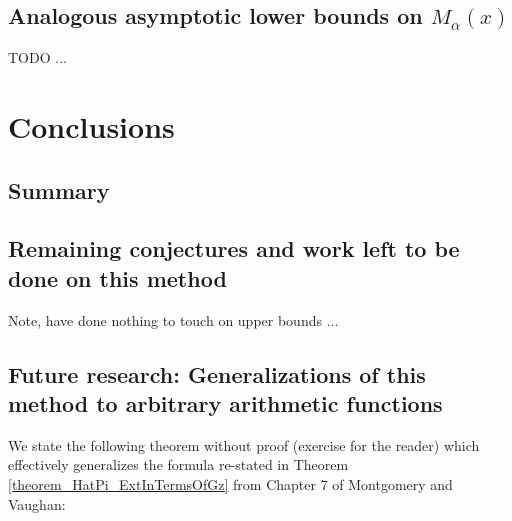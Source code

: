 \documentclass[11pt,reqno,a4letter]{article}
\numberwithin{figure}{section}
\numberwithin{table}{section}
\theoremstyle{plain}
\numberwithin{theorem}{section}
\theoremstyle{definition}
\begin{document}
\subsection{Analogous asymptotic lower bounds on $M_{\alpha}(x)$} 

TODO ... 

\newpage 
\section{Conclusions} 

\subsection{Summary} 

\subsection{Remaining conjectures and work left to be done on this method} 

Note, have done nothing to touch on upper bounds ... 

\subsection{Future research: Generalizations of this method to arbitrary arithmetic functions} 

We state the following theorem without proof (exercise for the reader) which effectively generalizes 
the formula re-stated in Theorem \ref{theorem_HatPi_ExtInTermsOfGz} from 
Chapter 7 of Montgomery and Vaughan: 
\end{document}
